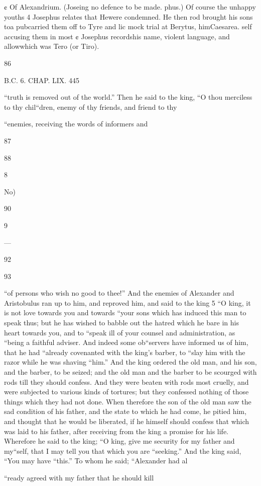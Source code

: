 ¢ Of Alexandrium. (Joseing no defence to be made. phus.) Of course the unhappy youths 4 Josephus relates that Hewere condemned. He then rod brought his sons toa pubcarried them off to Tyre and lic mock trial at Berytus, himCaesarea. self accusing them in most ¢ Josephus recordshis name, violent language, and allowwhich was Tero (or Tiro). 

86 

B.C. 6. CHAP. LIX. 445 

“truth is removed out of the world.” Then he said to the king, “O thou merciless to thy chil“dren, enemy of thy friends, and friend to thy 

“enemies, receiving the words of informers and 

87 

88 

8 

No) 

90 

9 

— 

92 

93 

“of persons who wish no good to thee!” And the enemies of Alexander and Aristobulus ran up to him, and reproved him, and said to the king 5 “O king, it is not love towards you and towards “your sons which has induced this man to speak thus; but he has wished to babble out the hatred which he bare in his heart towards you, and to “speak ill of your counsel and administration, as “being a faithful adviser. And indeed some ob“servers have informed us of him, that he had “already covenanted with the king’s barber, to “slay him with the razor while he was shaving “him.” And the king ordered the old man, and his son, and the barber, to be seized; and the old man and the barber to be scourged with rods till they should confess. And they were beaten with rods most cruelly, and were subjected to various kinds of tortures; but they confessed nothing of those things which they had not done. When therefore the son of the old man saw the sad condition of his father, and the state to which he had come, he pitied him, and thought that he would be liberated, if he himself should confess that which was laid to his father, after receiving from the king a promise for his life. Wherefore he said to the king; “O king, give me security for my father and my“self, that I may tell you that which you are “seeking.” And the king said, “You may have “this.” To whom he said; “Alexander had al

“ready agreed with my father that he should kill 

